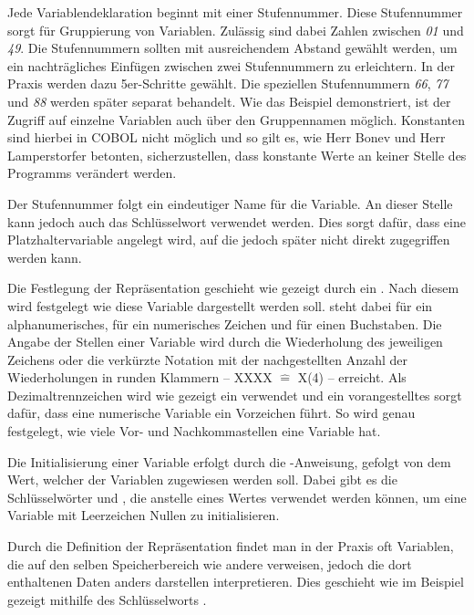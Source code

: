 Jede Variablendeklaration beginnt mit einer Stufennummer. Diese Stufennummer sorgt für Gruppierung von Variablen. Zulässig sind dabei Zahlen zwischen \textit{01} und \textit{49}. Die Stufennummern sollten mit ausreichendem Abstand gewählt werden, um ein nachträgliches Einfügen zwischen zwei Stufennummern zu erleichtern. In der Praxis werden dazu \idR 5er-Schritte gewählt. Die speziellen Stufennummern \textit{66}, \textit{77} und \textit{88} werden später separat behandelt. Wie das Beispiel demonstriert, ist der Zugriff auf einzelne Variablen auch über den Gruppennamen möglich. Konstanten sind hierbei in COBOL nicht möglich und so gilt es, wie Herr Bonev und Herr Lamperstorfer betonten, sicherzustellen, dass konstante Werte an keiner Stelle des Programms verändert werden.

Der Stufennummer folgt ein eindeutiger Name für die Variable. An dieser Stelle kann jedoch auch das Schlüsselwort  verwendet werden. Dies sorgt dafür, dass eine Platzhaltervariable angelegt wird, auf die jedoch später nicht direkt zugegriffen werden kann.

Die Festlegung der Repräsentation geschieht wie gezeigt durch ein . Nach diesem  wird festgelegt wie diese Variable dargestellt werden soll.  steht dabei für ein alphanumerisches,  für ein numerisches Zeichen und  für einen Buchstaben. Die Angabe der Stellen einer Variable wird durch die Wiederholung des jeweiligen Zeichens oder die verkürzte Notation mit der nachgestellten Anzahl der Wiederholungen in runden Klammern -- \zB XXXX $\widehat{=}$ X(4) -- erreicht. Als Dezimaltrennzeichen wird wie gezeigt ein  verwendet und ein vorangestelltes  sorgt dafür, dass eine numerische Variable ein Vorzeichen führt. So wird genau festgelegt, wie viele Vor- und Nachkommastellen eine Variable hat.

Die Initialisierung einer Variable erfolgt durch die -Anweisung, gefolgt von dem Wert, welcher der Variablen zugewiesen werden soll. Dabei gibt es die Schlüsselwörter  \bzw {} und  \bzw {}, die anstelle eines Wertes verwendet werden können, um eine Variable mit Leerzeichen \bzw Nullen zu initialisieren.

Durch die Definition der Repräsentation findet man in der Praxis oft Variablen, die auf den selben Speicherbereich wie andere verweisen, jedoch die dort enthaltenen Daten anders darstellen \bzw interpretieren. Dies geschieht wie im Beispiel gezeigt mithilfe des Schlüsselworts .

